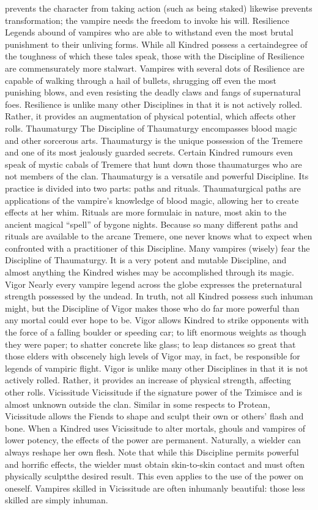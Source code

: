 \documentclass[10pt,a4paper]{article}
\begin{document}
prevents the character from taking action (such as being staked) likewise
prevents transformation; the vampire needs the freedom to invoke his will.
Resilience
Legends abound of vampires who are able to withstand even the most brutal
punishment to their unliving forms. While all Kindred possess a certaindegree of the toughness of which these tales speak, those with the Discipline
of Resilience are commensurately more stalwart. Vampires with several dots
of Resilience are capable of walking through a hail of bullets, shrugging off
even the most punishing blows, and even resisting the deadly claws and
fangs of supernatural foes.
Resilience is unlike many other Disciplines in that it is not actively rolled.
Rather, it provides an augmentation of physical potential, which affects
other rolls.
Thaumaturgy
The Discipline of Thaumaturgy encompasses blood magic and other
sorcerous arts. Thaumaturgy is the unique possession of the Tremere and
one of its most jealously guarded secrets. Certain Kindred rumours even
speak of mystic cabals of Tremere that hunt down those thaumaturges who
are not members of the clan.
Thaumaturgy is a versatile and powerful Discipline. Its practice is divided
into two parts: paths and rituals. Thaumaturgical paths are applications of
the vampire's knowledge of blood magic, allowing her to create effects at
her whim. Rituals are more formulaic in nature, most akin to the ancient
magical “spell” of bygone nights. Because so many different paths and
rituals are available to the arcane Tremere, one never knows what to expect
when confronted with a practitioner of this Discipline.
Many vampires (wisely) fear the Discipline of Thaumaturgy. It is a very
potent and mutable Discipline, and almost anything the Kindred wishes may
be accomplished through its magic.
Vigor
Nearly every vampire legend across the globe expresses the preternatural
strength possessed by the undead. In truth, not all Kindred possess such
inhuman might, but the Discipline of Vigor makes those who do far more
powerful than any mortal could ever hope to be. Vigor allows Kindred to
strike opponents with the force of a falling boulder or speeding car; to lift
enormous weights as though they were paper; to shatter concrete like glass;
to leap distances so great that those elders with obscenely high levels of
Vigor may, in fact, be responsible for legends of vampiric flight.
Vigor is unlike many other Disciplines in that it is not actively rolled.
Rather, it provides an increase of physical strength, affecting other rolls.
Vicissitude
Vicissitude if the signature power of the Tzimisce and is almost unknown
outside the clan. Similar in some respects to Protean, Vicissitude allows the
Fiends to shape and sculpt their own or others' flash and bone. When a
Kindred uses Vicissitude to alter mortals, ghouls and vampires of lower
potency, the effects of the power are permanent. Naturally, a wielder can
always reshape her own flesh.
Note that while this Discipline permits powerful and horrific effects, the
wielder must obtain skin-to-skin contact and must often physically sculptthe desired result. This even applies to the use of the power on oneself.
Vampires skilled in Vicissitude are often inhumanly beautiful: those less
skilled are simply inhuman.
	

	
\end{document}
